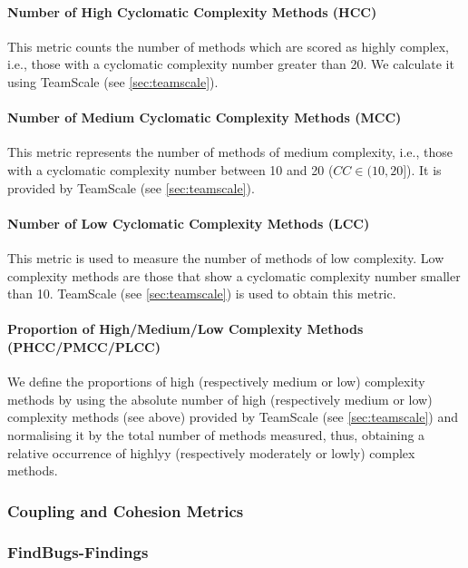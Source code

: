 \documentclass{scrartcl}
\begin{document}
\paragraph{Number of High Cyclomatic Complexity Methods (HCC)}

This metric counts the number of methods which are scored as highly complex,
i.e., those with a cyclomatic complexity number greater than 20. We calculate it
using TeamScale (see \ref{sec:teamscale}).

\paragraph{Number of Medium Cyclomatic Complexity Methods (MCC)}

This metric represents the number of methods of medium complexity, i.e., those
with a cyclomatic complexity number between 10 and 20 ($CC \in (10, 20]$). It is
provided by TeamScale (see \ref{sec:teamscale}).

\paragraph{Number of Low Cyclomatic Complexity Methods (LCC)}

This metric is used to measure the number of methods of low complexity. Low
complexity methods are those that show a cyclomatic complexity number smaller
than 10. TeamScale (see \ref{sec:teamscale}) is used to obtain this metric.

\paragraph{Proportion of High/Medium/Low Complexity Methods (PHCC/PMCC/PLCC)}

We define the proportions of high (respectively medium or low) complexity
methods by using the absolute number of high (respectively medium or low)
complexity methods (see above)  provided by TeamScale (see \ref{sec:teamscale})
and normalising it by the total number of methods measured, thus, obtaining a
relative occurrence of highlyy (respectively moderately or lowly) complex
methods.

\subsubsection{Coupling and Cohesion Metrics}

\subsubsection{FindBugs-Findings}
\end{document}
